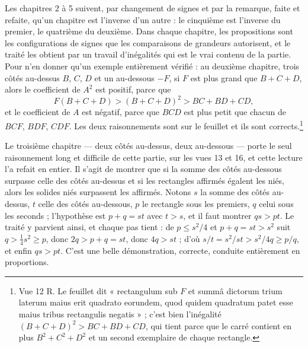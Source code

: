 \documentclass[11pt,a4paper]{article}
\begin{document}
Les chapitres 2 à 5 suivent, par changement de signes et par la remarque, faite
et refaite, qu'un chapitre est l'inverse d'un autre : le cinquième est l'inverse
du premier, le quatrième du deuxième. Dans chaque chapitre, les propositions
sont les configurations de signes que les comparaisons de grandeurs autorisent,
et le traité les obtient par un travail d'inégalités qui est le vrai contenu de
la partie. Pour n'en donner qu'un exemple entièrement vérifié : au deuxième
chapitre, trois côtés au-dessus $B$, $C$, $D$ et un au-dessous $-F$, si $F$ est
plus grand que $B + C + D$, alors le coefficient de $A^2$ est positif, parce que
\[ F(B+C+D) > (B+C+D)^2 > BC + BD + CD, \]
et le coefficient de $A$ est négatif, parce que $BCD$ est plus petit que chacun
de $BCF$, $BDF$, $CDF$. Les deux raisonnements sont sur le feuillet et ils sont
corrects.\footnote{Vue 12 R. Le feuillet dit « rectangulum sub $F$ et summâ
dictorum trium laterum maius erit quadrato eorundem, quod quidem quadratum patet
esse maius tribus rectangulis negatis » ; c'est bien l'inégalité
$(B+C+D)^2 > BC+BD+CD$, qui tient parce que le carré contient en plus
$B^2 + C^2 + D^2$ et un second exemplaire de chaque rectangle.}

Le troisième chapitre — deux côtés au-dessus, deux au-dessous — porte le seul
raisonnement long et difficile de cette partie, sur les vues 13 et 16, et cette
lecture l'a refait en entier. Il s'agit de montrer que si la somme des côtés
au-dessous surpasse celle des côtés au-dessus et si les rectangles affirmés
égalent les niés, alors les solides niés surpassent les affirmés. Notons $s$ la
somme des côtés au-dessus, $t$ celle des côtés au-dessous, $p$ le rectangle sous
les premiers, $q$ celui sous les seconds ; l'hypothèse est $p + q = st$ avec
$t > s$, et il faut montrer $qs > pt$. Le traité y parvient ainsi, et chaque pas
tient : de $p \le s^2/4$ et $p + q = st > s^2$ suit $q > \tfrac14 s^2 \ge p$,
donc $2q > p + q = st$, donc $4q > st$ ; d'où
$s/t = s^2/st > s^2/4q \ge p/q$, et enfin $qs > pt$. C'est une belle
démonstration, correcte, conduite entièrement en proportions.
\end{document}
